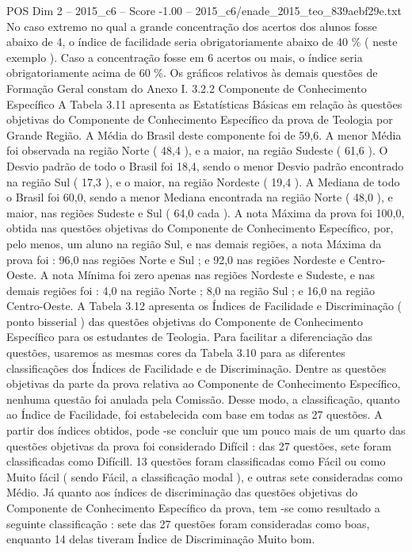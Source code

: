 \begin{textsample}{POS Dim 2 – 2015\_c6 – Score -1.00 – 2015\_c6/enade\_2015\_teo\_839aebf29e.txt}
No caso extremo no qual a grande concentração dos acertos dos alunos fosse abaixo de 4, o índice de facilidade seria obrigatoriamente abaixo de 40 \% ( neste exemplo ).
Caso a concentração fosse em 6 acertos ou mais, o índice seria obrigatoriamente acima de 60 \%.
Os gráficos relativos às demais questões de Formação Geral constam do Anexo I. 3.2.2 Componente de Conhecimento Específico A Tabela 3.11 apresenta as Estatísticas Básicas em relação às questões objetivas do Componente de Conhecimento Específico da prova de Teologia por Grande Região.
A Média do Brasil deste componente foi de 59,6.
A menor Média foi observada na região Norte ( 48,4 ), e a maior, na região Sudeste ( 61,6 ).
O Desvio padrão de todo o Brasil foi 18,4, sendo o menor Desvio padrão encontrado na região Sul ( 17,3 ), e o maior, na região Nordeste ( 19,4 ).
A Mediana de todo o Brasil foi 60,0, sendo a menor Mediana encontrada na região Norte ( 48,0 ), e maior, nas regiões Sudeste e Sul ( 64,0 cada ).
A nota Máxima da prova foi 100,0, obtida nas questões objetivas do Componente de Conhecimento Específico, por, pelo menos, um aluno na região Sul, e nas demais regiões, a nota Máxima da prova foi : 96,0 nas regiões Norte e Sul ; e 92,0 nas regiões Nordeste e Centro-Oeste.
A nota Mínima foi zero apenas nas regiões Nordeste e Sudeste, e nas demais regiões foi : 4,0 na região Norte ; 8,0 na região Sul ; e 16,0 na região Centro-Oeste.
A Tabela 3.12 apresenta os Índices de Facilidade e Discriminação ( ponto bisserial ) das questões objetivas do Componente de Conhecimento Específico para os estudantes de Teologia.
Para facilitar a diferenciação das questões, usaremos as mesmas cores da Tabela 3.10 para as diferentes classificações dos Índices de Facilidade e de Discriminação.
Dentre as questões objetivas da parte da prova relativa ao Componente de Conhecimento Específico, nenhuma questão foi anulada pela Comissão.
Desse modo, a classificação, quanto ao Índice de Facilidade, foi estabelecida com base em todas as 27 questões.
A partir dos índices obtidos, pode -se concluir que um pouco mais de um quarto das questões objetivas da prova foi considerado Difícil : das 27 questões, sete foram classificadas como Difícill. 13 questões foram classificadas como Fácil ou como Muito fácil ( sendo Fácil, a classificação modal ), e outras sete consideradas como Médio.
Já quanto aos índices de discriminação das questões objetivas do Componente de Conhecimento Específico da prova, tem -se como resultado a seguinte classificação : sete das 27 questões foram consideradas como boas, enquanto 14 delas tiveram Índice de Discriminação Muito bom.

\end{textsample}
